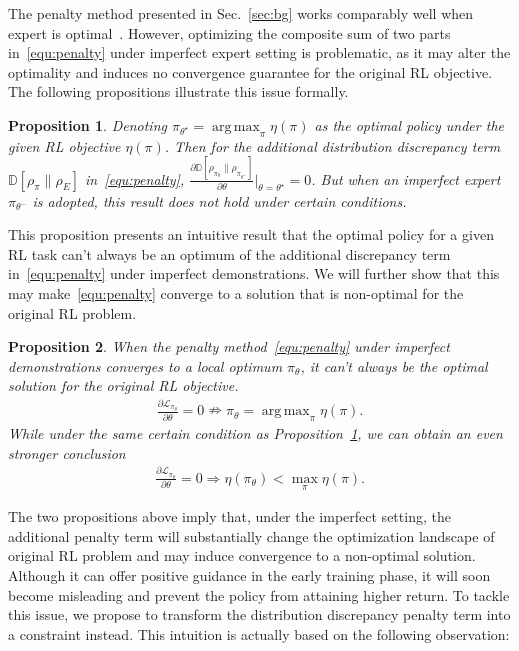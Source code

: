 \documentclass[letterpaper]{article} %
\newtheorem{proposition}{Proposition}
\DeclareMathOperator*{\argmax}{arg\,max}
\begin{document}
The penalty method presented in Sec.~\ref{sec:bg} works comparably well when expert is optimal~\cite{ijcaipofd1,pofd}. However, optimizing the composite sum of two parts in~\eqref{equ:penalty} under imperfect expert setting is problematic, as it may alter the optimality and induces no convergence guarantee for the original RL objective. The following propositions illustrate this issue formally.
\begin{proposition}\label{prop:1}
Denoting $\pi_{\theta^\star} = \argmax_\pi \eta(\pi)$ as the optimal policy under the given RL objective $\eta(\pi)$. Then for the additional distribution discrepancy term $\mathbb{D}\left[\rho_\pi\|\rho_E\right]$ in~\eqref{equ:penalty}, $\frac{\partial\mathbb{D}[\rho_{\pi_{\theta}}\| \rho_{\pi_{\theta^{+}}}]}{\partial\theta}\big|_{\theta=\theta^\star}= 0$. But when an imperfect expert $\pi_{\theta^-}$ is adopted, this result does not hold under certain conditions.
\end{proposition}
This proposition presents an intuitive result that the optimal policy for a given RL task can't always be an optimum of the additional discrepancy term in~\eqref{equ:penalty} under imperfect demonstrations. We will further show that this may make~\eqref{equ:penalty} converge to a solution that is non-optimal for the original RL problem.
\begin{proposition}\label{prop:2}
When the penalty method~\eqref{equ:penalty} under imperfect demonstrations converges to a local optimum $\pi_\theta$, it can't always be the optimal solution for the original RL objective.
\begin{align}
        \frac{\partial\mathcal{L}_{\pi_\theta}}{\partial\theta} = 0 \nRightarrow \pi_\theta = \argmax_\pi \eta(\pi)\text{.}\nonumber
\end{align}
While under the same certain condition as Proposition~\ref{prop:1}, we can obtain an even stronger conclusion
\begin{align}
    \frac{\partial\mathcal{L}_{\pi_\theta}}{\partial\theta} = 0 \Rightarrow \eta(\pi_\theta) < \max_\pi \eta(\pi)\text{.}\nonumber
\end{align}
\end{proposition}
The two propositions above imply that, under the imperfect setting, the additional penalty term will substantially change the optimization landscape of original RL problem and may induce convergence to a non-optimal solution. Although it can offer positive guidance in the early training phase, it will soon become misleading and prevent the policy from attaining higher return. To tackle this issue, we propose to transform the distribution discrepancy penalty term into a constraint instead. This intuition is actually based on the following observation:
\end{document}
